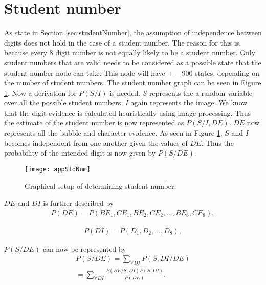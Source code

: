 \section{Student number}
As state in Section \ref{sec:studentNumber}, the assumption of independence between digits does not hold in the case of a student number. The reason for this is, because every 8 digit number is not equally likely to be a student number. Only student numbers that are valid needs to be considered as a possible state that the student number node can take. This node will have $+- 900$ states, depending on the number of student numbers. The student number graph can be seen in Figure \ref{fig:stdNum}. Now a derivation for $P(S/I)$ is needed. $S$ represents the a random variable over all the possible student numbers. $I$ again represents the image. We know that the digit evidence is calculated heuristically using image processing. Thus the estimate of the student number is now represented as $P(S/I,DE)$. $DE$ now represents all the bubble and character evidence. As seen in Figure \ref{fig:stdNum}, $S$ and $I$ becomes independent from one another given the values of $DE$. Thus the probability of the intended digit is now given by $P(S/DE)$.

\begin{figure}
  \centering
  \texttt{[image: appStdNum]}\\
  \caption{Graphical setup of determining student number.}
  \label{fig:stdNum}
\end{figure}

$DE$ and $DI$ is further described by 
\begin{align}
  P(DE) =  P(BE_1,CE_1,BE_2,CE_2,...,BE_8,CE_8),
\label{eqn:ansIndep}
\end{align}

\begin{align}
  P(DI) =  P(D_1,D_2,...,D_8),
\label{eqn:ansIndep2}
\end{align}

$P(S/DE)$ can now be represented by
\begin{align}
  P(S/DE)	=  \sum_{\forall DI}^{}  P(S,DI/DE)\\
  					=  \sum_{\forall DI}^{}  \frac{P(BE/S,DI)P(S,DI)}{P(DE)}.
\label{eqn:stdEqn2}
\end{align}

